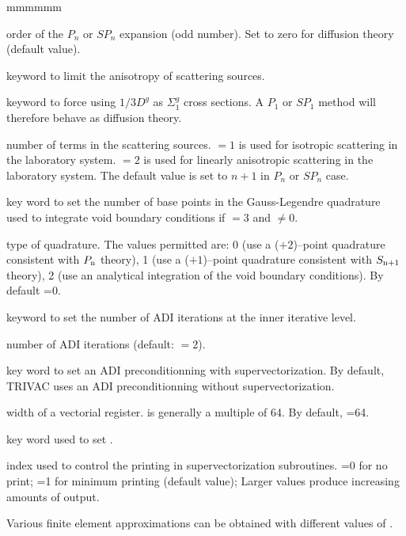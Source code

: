 \begin{ListeDeDescription}{mmmmmm}
\item[\dusa{n}] order of the $P_n$ or $SP_n$ expansion (odd number). Set to zero for diffusion theory (default value).

\item[\moc{SCAT}] keyword to limit the anisotropy of scattering sources.

\item[\moc{DIFF}] keyword to force using $1/3D^{g}$ as $\Sigma_1^{g}$ cross sections. A $P_1$ or $SP_1$ method
will therefore behave as diffusion theory.

\item[\dusa{iscat}] number of terms in the scattering sources.  $=1$ is used for
isotropic scattering in the laboratory system.  $=2$ is used for
linearly anisotropic scattering in the laboratory system. The default value is set to $n+1$
in $P_n$ or $SP_n$ case.

\item[\moc{VOID}] key word to set the number of base points in the Gauss-Legendre quadrature used to integrate
void boundary conditions if  $=3$ and  $\ne 0$.

\item[\dusa{nvd}] type of quadrature. The values
permitted are: 0 (use a ($+2$)--point quadrature consistent with $P_{\rm n}$ theory),
1 (use a ($+1$)--point quadrature consistent with $S_{{\rm n}+1}$ theory),
2 (use an analytical integration of the void boundary conditions). By default =0.

\item[\moc{ADI}] keyword to set the number of ADI iterations at the inner
iterative level.

\item[\dusa{nadi}] number of ADI iterations (default:  $=2$).

\item[\moc{VECT}] key word to set an ADI preconditionning with
supervectorization. By default, TRIVAC uses an ADI preconditionning without
supervectorization.

\item[\dusa{iseg}] width of a vectorial register.  is generally a multiple of 64. By default, =64.

\item[\moc{PRTV}] key word used to set .

\item[\dusa{impv}] index used to control the  printing in supervectorization
subroutines. =0 for no print; =1 for minimum printing (default value); Larger
values produce increasing amounts of output.

\end{ListeDeDescription}

Various finite element approximations can be obtained with different values of .

\eject
